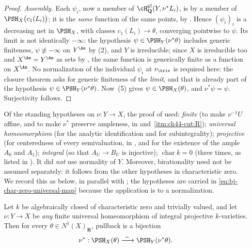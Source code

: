 \begin{proof}
\emph{Assembly.}  Each $\psi_i$, now a member of
$\cH^{\mathrm{gf}}_{\mathbf Q}(Y,\nu^*L_i)$, is by
 a member of
$\PSH_X\bigl(c_1(L_i)\bigr)$; it is the \emph{same} function of the same
points, by .  Hence
$(\psi_i)_i$ is a decreasing net in $\PSH_X$, with classes
$c_1(L_i)\to\theta$, converging pointwise to $\psi$.  Its limit is not
identically $-\infty$: the hypothesis $\psi\in\PSH_Y(\nu^*\theta)$
includes generic finiteness, $\psi\not\equiv-\infty$ on $Y^{\An}$ by
(2), and $Y$ is irreducible; since $X$ is irreducible
too and $X^{\An}=Y^{\An}$ as sets by
, the same function is
generically finite as a function on $X^{\An}$.  No normalization of the
individual $\psi_i$ at $v_\triv$ is required here: the closure theorem
asks for generic finiteness of the \emph{limit}, and that is already part of
the hypothesis $\psi\in\PSH_Y(\nu^*\theta)$.  Now
\,(5) gives $\psi\in\PSH_X(\theta)$, and
$\nu^*\psi=\psi$.  Surjectivity follows.
\end{proof}

\begin{remark}
\label{rem:ch44-reflection-hypotheses}
Of the standing hypotheses on $\nu:Y\to X$, the proof of
 used: \emph{finite} (to make
$\nu^{-1}U$ affine, and to make $\nu^*$ preserve ampleness, in
 and
\,\cref{itm:ch44-cut:R}); \emph{universal
homeomorphism} (for the analytic identification and for subintegrality);
\emph{projective} (for centeredness of every semivaluation, in
, and for the existence of the ample $A_0$
and $A_1$); \emph{integral} (so that $A_U\to B_U$ is injective);
\emph{$\operatorname{char}k=0$} (three times, as listed in
).  It did \emph{not} use normality of $Y$.
Moreover, birationality need not be assumed separately: it follows from the
other hypotheses in characteristic zero.  We record this as
 below, in parallel with
; the hypotheses are carried in
\eqref{eq:bj-char-zero-universal-map} because the application is to a
normalization.
\end{remark}

\begin{proposition}
\label{prop:ch44-no-birational}
Let $k$ be algebraically closed of characteristic zero and trivially
valued, and let $\nu:Y\to X$ be \emph{any} finite universal homeomorphism
of integral projective $k$-varieties.  Then for every
$\theta\in N^1(X)_{\mathbf R}$, pullback is a bijection
\[
 \nu^*:\PSH_X(\theta)\xrightarrow{\ \sim\ }\PSH_Y(\nu^*\theta).
\]
\end{proposition}

